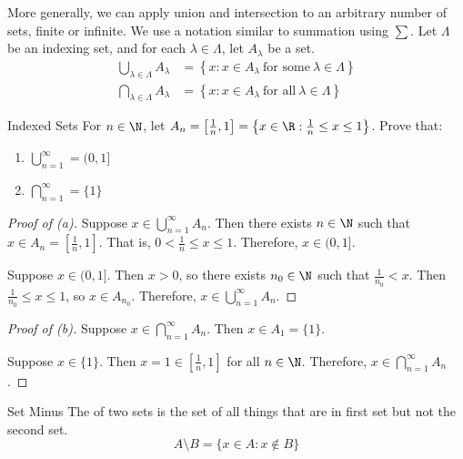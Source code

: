 \documentclass[12pt]{report}
\begin{document}
More generally, we can apply union and intersection to an arbitrary number of sets, finite or infinite. We use a notation similar to summation using $\sum$. Let $\Lambda$ be an indexing set, and for each $\lambda \in \Lambda$, let $A_\lambda$ be a set.
\begin{align*}
    \bigcup_{\lambda \in \Lambda} A_\lambda &= \left\{ x : x \in A_\lambda\ \text{for some}\ \lambda \in \Lambda \right\} \\
    \bigcap_{\lambda \in \Lambda} A_\lambda &= \left\{ x : x \in A_\lambda\ \text{for all}\ \lambda \in \Lambda \right\}
\end{align*}
\begin{exbox}{Indexed Sets}{}
    For $n \in \N$, let $A_n = \left[ \frac{1}{n}, 1 \right] = \left\{ x \in \R : \frac{1}{n} \leq x \leq 1 \right\}$. Prove that:
    \begin{enumerate}[label=(\alph*)]
        \item $\bigcup_{n=1}^\infty = (0,1]$
        \item $\bigcap_{n=1}^\infty = \{1\}$
    \end{enumerate}
    \tcblower
    \begin{proof}[Proof of (a)]
        Suppose $x \in \bigcup_{n=1}^\infty A_n$. Then there exists $n \in \N$ such that $x \in A_n = \left[ \frac{1}{n}, 1 \right]$. That is, $0 < \frac{1}{n} \leq x \leq 1$. Therefore, $x \in (0, 1]$.

        Suppose $x \in (0, 1]$. Then $x > 0$, so there exists $n_0 \in \N$ such that $\frac{1}{n_0} < x$. Then $\frac{1}{n_0} \leq x \leq 1$, so $x \in A_{n_0}$. Therefore, $x \in \bigcup_{n=1}^\infty A_n$.
    \end{proof}

    \begin{proof}[Proof of (b)]
        Suppose $x \in \bigcap_{n=1}^\infty A_n$. Then $x \in A_1 = \{1\}$.

        Suppose $x \in \{1\}$. Then $x = 1 \in \left[ \frac{1}{n}, 1 \right]$ for all $n \in \N$. Therefore, $x \in \bigcap_{n=1}^\infty A_n$.
    \end{proof}
\end{exbox}

\begin{dfnbox}{Set Minus}{}
    The  of two sets is the set of all things that are in first set but not the second set.
    \tcblower
    \[ A \setminus B = \{ x \in A : x \notin B \} \]
\end{dfnbox}
\end{document}
